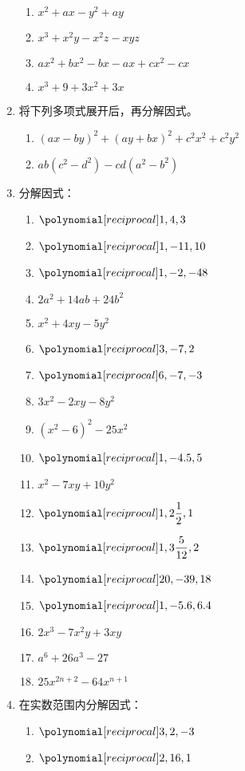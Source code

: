 \begin{enumerate}
\begin{multicols}{2}
\begin{enumerate}
    \item $x^2+ax-y^2+ay$
    \item $x^3+x^2y-x^2z-xyz$
    \item $ax^2+bx^2-bx-ax+cx^2-cx$
    \item $x^3+9+3x^2+3x$
\end{enumerate}
\end{multicols}
    \item 将下列多项式展开后，再分解因式。
\begin{enumerate}
    \item $(ax-by)^2+(ay+bx)^2+c^2x^2+c^2y^2$
    \item $ab(c^2-d^2)-cd(a^2-b^2)$
\end{enumerate}
    \item 分解因式：
\begin{multicols}{2}
\begin{enumerate}
    \item $\poly{1,4,3}$
    \item $\poly{1,-11,10}$
    \item $\poly{1,-2,-48}$
    \item $2a^2+14ab+24b^2$
    \item $x^2+4xy-5y^2$
    \item $\poly{3,-7,2}$
    \item $\poly{6,-7,-3}$
    \item $3x^2 − 2xy − 8y^2$
    \item $(x^2-6)^2-25x^2$
    \item $\poly{1,-4.5,5}$
    \item $x^2 −7xy+10y^2$
    \item $\poly{1,2\frac{1}{2},1}$
    \item $\poly{1,3\frac{5}{12},2}$
    \item $\poly{20,-39,18}$
    \item $\poly{1,-5.6,6.4}$
    \item $2x^3 − 7x^2y + 3xy$
    \item $a^6+26a^3-27$
    \item $25x^{2n+2}-64x^{n+1}$
\end{enumerate}
\end{multicols}
    \item 在实数范围内分解因式：
    \begin{multicols}{2}
    \begin{enumerate}
        \item $\poly{3,2,-3}$
        \item $\poly{2,16,1}$

\end{enumerate}
\end{multicols}
\end{enumerate}
